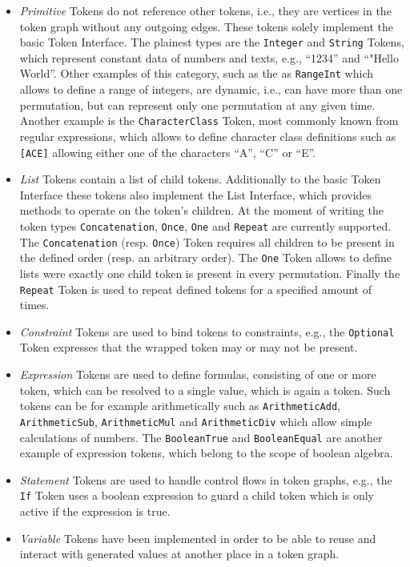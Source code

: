 \begin{itemize}
\item \textit{Primitive} Tokens do not reference other tokens, i.e., they are vertices in the token graph without any outgoing edges. These tokens solely implement the basic Token Interface. The plainest types are the \texttt{Integer} and \texttt{String} Tokens, which represent constant data of numbers and texts, e.g., \enquote{1234} and \enquote{"Hello World}. Other examples of this category, such as the as \texttt{RangeInt} which allows to define a range of integers, are dynamic, i.e., can have more than one permutation, but can represent only one permutation at any given time. Another example is the \texttt{CharacterClass} Token, most commonly known from regular expressions, which allows to define character class definitions such as \texttt{[ACE]} allowing either one of the characters \enquote{A}, \enquote{C} or \enquote{E}.
\item \textit{List} Tokens contain a list of child tokens. Additionally to the basic Token Interface these tokens also implement the List Interface, which provides methods to operate on the token's children. At the moment of writing the token types \texttt{Concatenation}, \texttt{Once}, \texttt{One} and \texttt{Repeat} are currently supported. The \texttt{Concatenation} (resp. \texttt{Once}) Token requires all children to be present in the defined order (resp. an arbitrary order). The \texttt{One} Token allows to define lists were exactly one child token is present in every permutation. Finally the \texttt{Repeat} Token is used to repeat defined tokens for a specified amount of times.
\item \textit{Constraint} Tokens are used to bind tokens to constraints, e.g., the \texttt{Optional} Token expresses that the wrapped token may or may not be present.
\item \textit{Expression} Tokens are used to define formulas, consisting of one or more token, which can be resolved to a single value, which is again a token. Such tokens can be for example arithmetically such as \texttt{ArithmeticAdd}, \texttt{ArithmeticSub}, \texttt{ArithmeticMul} and \texttt{ArithmeticDiv} which allow simple calculations of numbers. The \texttt{BooleanTrue} and \texttt{BooleanEqual} are another example of expression tokens, which belong to the scope of boolean algebra.
\item \textit{Statement} Tokens are used to handle control flows in token graphs, e.g., the \texttt{If} Token uses a boolean expression to guard a child token which is only active if the expression is true.
\item \textit{Variable} Tokens have been implemented in order to be able to reuse and interact with generated values at another place in a token graph.
\end{itemize}

